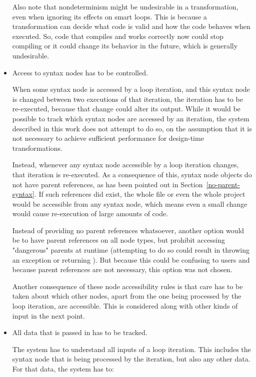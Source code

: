 \begin{itemize}
Also note that nondeterminism might be undesirable in a transformation, even when ignoring its effects on smart loops. This is because a transformation can decide what code is valid and how the code behaves when executed. So, code that compiles and works correctly now could stop compiling or it could change its behavior in the future, which is generally undesirable.

\item Access to syntax nodes has to be controlled.

\nopagebreak

When some syntax node is accessed by a loop iteration, and this syntax node is changed between two executions of that iteration, the iteration has to be re-executed, because that change could alter its output. While it would be possible to track which syntax nodes are accessed by an iteration, the system described in this work does not attempt to do so, on the assumption that it is not necessary to achieve sufficient performance for design-time transformations.

\label{no-parent-transform}
Instead, whenever any syntax node accessible by a loop iteration changes, that iteration is re-executed. As a consequence of this, syntax node objects do not have parent references, as has been pointed out in Section~\ref{no-parent-syntax}. If such references did exist, the whole file or even the whole project would be accessible from any syntax node, which means even a small change would cause re-execution of large amounts of code.

Instead of providing no parent references whatsoever, another option would be to have parent references on all node types, but prohibit accessing "dangerous" parents at runtime (attempting to do so could result in throwing an exception or returning ). But because this could be confusing to users and because parent references are not necessary, this option was not chosen.

Another consequence of these node accessibility rules is that care has to be taken about which other nodes, apart from the one being processed by the loop iteration, are accessible. This is considered along with other kinds of input in the next point.

\item All data that is passed in has to be tracked.

\nopagebreak

The system has to understand all inputs of a loop iteration. This includes the syntax node that is being processed by the iteration, but also any other data. For that data, the system has to:


\end{itemize}
